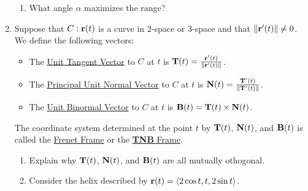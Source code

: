 \documentclass[12pt]{article}
\newif\ifans
\begin{document}
\begin{enumerate}
\begin{enumerate}
\item What angle $\alpha$ maximizes the range?

\ifans{\fbox{\parbox{1\linewidth}{In part (e), we have already computed the range to be $\frac{v_0^2}{g}\sin{(2\alpha)}$.  This is maximized when $\sin(2\alpha)=1$; i.e., when $\alpha =\frac{\pi}{4}$
}}} \fi

\end{enumerate}

\item Suppose that $C:{\bf r}(t)$ is a curve in 2-space or 3-space and that $\|{\bf r}^{\prime}(t)\|\neq 0$.  We define the following vectors:
\begin{itemize}

\item The \underline{Unit Tangent Vector} to $C$ at $t$ is ${\bf T}(t)=\frac{{\bf r}^{\prime}(t)}{\|{\bf r}^{\prime}(t)\|}$.

\item The \underline{Principal Unit Normal Vector} to $C$ at $t$ is ${\bf N}(t)=\frac{{\bf T}^{\prime}(t)}{\|{\bf T}^{\prime}(t)\|}$.

\item The \underline{Unit Binormal Vector} to $C$ at $t$ is ${\bf B}(t)={\bf T}(t)\times {\bf N}(t)$.

\end{itemize}

The coordinate system determined at the point $t$ by ${\bf T}(t)$, ${\bf N}(t)$, and ${\bf B}(t)$ is called the \underline{Frenet Frame} or the \underline{{\bf TNB} Frame}.

\begin{enumerate}

\item Explain why ${\bf T}(t)$, ${\bf N}(t)$, and ${\bf B}(t)$ are all mutually othogonal.

\ifans{\fbox{\parbox{1\linewidth}{${\bf N}(t)\perp {\bf T}(t)$ by problem 9.  ${\bf B}(t) \perp {\bf N}(t)$ and ${\bf B}(t) \perp {\bf T}(t)$ because for any vectors in three space ${\bf v} \cdot ({\bf v}\times{\bf w})=0$ and ${\bf w} \cdot ({\bf v}\times{\bf w})=0$}}} \fi

\item Consider the helix described by ${\bf r}(t)=\langle 2 \cos{t}, t, 2\sin{t} \rangle$.


\end{enumerate}
\end{enumerate}
\end{document}
